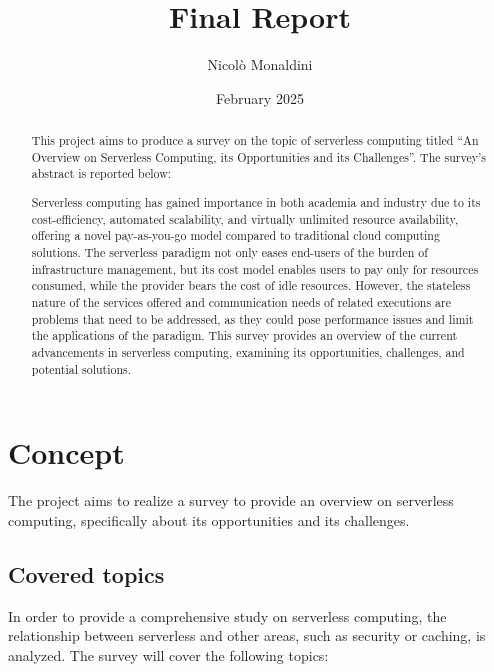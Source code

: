 \documentclass{scrartcl}
\title{\LARGE
    Final Report
}
\author{
    Nicolò Monaldini \\ \emailaddr{nicolo.monaldini@studio.unibo.it}
}
\date{February 2025}
\begin{document}
\maketitle

\begin{abstract}
    This project aims to produce a survey on the topic of serverless computing titled ``An Overview on Serverless Computing, its Opportunities and its Challenges''. The survey's abstract is reported below: 
    
    Serverless computing has gained importance in both academia and industry due to its cost-efficiency, automated scalability, and virtually unlimited resource availability, offering a novel pay-as-you-go model compared to traditional cloud computing solutions. The serverless paradigm not only eases end-users of the burden of infrastructure management, but its cost model enables users to pay only for resources consumed, while the provider bears the cost of idle resources. However, the stateless nature of the services offered and communication needs of related executions are problems that need to be addressed, as they could pose performance issues and limit the applications of the paradigm. This survey provides an overview of the current advancements in serverless computing, examining its opportunities, challenges, and potential solutions. 
\end{abstract}

\newpage
\section{Concept}\label{concept}

The project aims to realize a survey to provide an overview on serverless computing, specifically about its opportunities and its challenges.

\subsection{Covered topics}

In order to provide a comprehensive study on serverless computing, the relationship between serverless and other areas, such as security or caching, is analyzed. The survey will cover the following topics:
\end{document}
